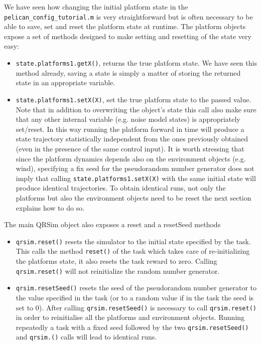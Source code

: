 \documentclass[a4paper,11pt]{article}
\begin{document}
We have seen how changing the initial platform state in the \texttt{pelican\_config\_tutorial.m} is very straightforward but is often necessary to be able to save, set and reset the platform state at runtime.
The platform objects expose a set of methods designed to make setting and resetting of the state very easy:
\begin{itemize}
\item \texttt{state.platforms{1}.getX()}, returns the true platform state. We have seen this method already, saving a state is simply a matter of storing the returned state in an appropriate variable.
\item \texttt{state.platforms{1}.setX(X)}, set the true platform state to the passed value. Note that in addition to overwriting the object's state this call also make sure that any other internal variable (e.g. noise model states) is appropriately set/reset. In this way running the platform forward in time will produce a state trajectory statistically independent from the ones previously obtained (even in the presence of the same control input).
It is worth stressing that since the platform dynamics depends also on the environment objects (e.g. wind), specifying a fix seed for the pseudorandom number generator does not imply that calling \texttt{state.platforms{1}.setX(X)} with the same initial state will produce identical trajectories.
To obtain identical runs, not only the platforms but also the environment objects need to be reset the next section explains how to do so.
\end{itemize}

The main QRSim object also exposes a reset and a resetSeed methods 
\begin{itemize}
\item \texttt{qrsim.reset()} resets the simulator to the initial state specified by the task. This calls the method \texttt{reset()} of the task which takes care of re-initializing the platforms state, it also resets the task reward to zero.  
Calling \texttt{qrsim.reset()} will not reinitialize the random number generator.

\item \texttt{qrsim.resetSeed()} resets the seed of the pseudorandom number generator to the value specified in the task (or to a random value if in the task the seed is set to $0$). After calling \texttt{qrsim.resetSeed()} is necessary to call \texttt{qrsim.reset()} in order to reinitialise all the platforms and environment objects.
Running repeatedly a task with a fixed seed followed by the two \texttt{qrsim.resetSeed()} and \texttt{qrsim.()} calls will lead to identical runs.
\end{itemize}
\end{document}
